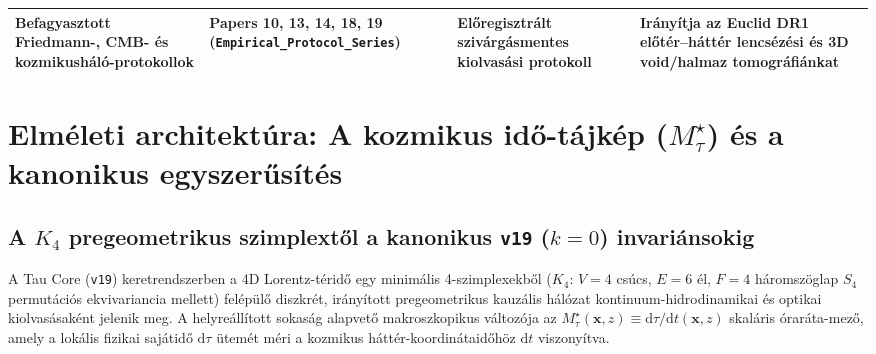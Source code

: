 \documentclass[11pt,a4paper]{article}
\begin{document}
\begin{table}[H]
{\begin{tabular}{L{3.5cm}L{3.1cm}L{4.3cm}L{4.3cm}}
\addlinespace[3pt]
Befagyasztott Friedmann-, CMB- és kozmikusháló-protokollok & \textbf{Papers 10, 13, 14, 18, 19} (\texttt{Empirical\_\allowbreak Protocol\_\allowbreak Series}) & Előregisztrált szivárgásmentes kiolvasási protokoll & Irányítja az Euclid DR1 előtér--háttér lencsézési és 3D void/halmaz tomográfiánkat \\
\bottomrule
\end{tabular}%
}
\end{table}

\newpage
\section{Elméleti architektúra: A kozmikus idő-tájkép (\texorpdfstring{$M_\tau^\star$}{M\_tau*}) és a kanonikus egyszerűsítés}

\subsection{A \texorpdfstring{$K_4$}{K4} pregeometrikus szimplextől a kanonikus \texorpdfstring{\texttt{v19} ($k = 0$)}{v19 (k = 0)} invariánsokig}

A Tau Core (\texttt{v19}) keretrendszerben a 4D Lorentz-téridő egy minimális 4-szimplexekből ($K_4$: $V = 4$ csúcs, $E = 6$ él, $F = 4$ háromszöglap $S_4$ permutációs ekvivariancia mellett) felépülő diszkrét, irányított pregeometrikus kauzális hálózat kontinuum-hidrodinamikai és optikai kiolvasásaként jelenik meg. A helyreállított sokaság alapvető makroszkopikus változója az $M_\tau^\star(\mathbf{x}, z) \equiv \mathrm{d}\tau/\mathrm{d}t(\mathbf{x}, z)$ skaláris óraráta-mező, amely a lokális fizikai sajátidő $\mathrm{d}\tau$ ütemét méri a kozmikus háttér-koordinátaidőhöz $\mathrm{d}t$ viszonyítva.
\end{document}
